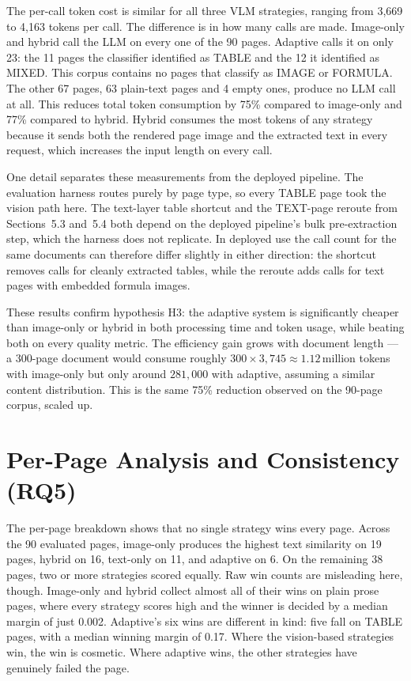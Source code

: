 The per-call token cost is similar for all three VLM strategies, ranging
from 3{,}669 to 4{,}163 tokens per call. The difference is in how many
calls are made. Image-only and hybrid call the LLM on every one of the
90 pages. Adaptive calls it on only 23: the 11 pages the classifier
identified as TABLE and the 12 it identified as MIXED. This corpus
contains no pages that classify as IMAGE or FORMULA. The other 67 pages,
63 plain-text pages and 4 empty ones, produce no LLM call at all.
This reduces total token consumption by 75\% compared to image-only and
77\% compared to hybrid. Hybrid consumes the most tokens of any strategy
because it sends both the rendered page image and the extracted text in
every request, which increases the input length on every call.

One detail separates these measurements from the deployed pipeline.
The evaluation harness routes purely by page type, so every TABLE page
took the vision path here. The text-layer table shortcut and the TEXT-page
reroute from Sections~5.3 and~5.4 both depend on the deployed pipeline's
bulk pre-extraction step, which the harness does not replicate. In deployed
use the call count for the same documents can therefore differ slightly in
either direction: the shortcut removes calls for cleanly extracted tables,
while the reroute adds calls for text pages with embedded formula images.

These results confirm hypothesis H3: the adaptive system is significantly
cheaper than image-only or hybrid in both processing time and token usage,
while beating both on every quality metric. The efficiency gain grows
with document length --- a 300-page document would consume roughly
$300 \times 3{,}745 \approx 1.12$\,million tokens with image-only but only
around $281{,}000$ with adaptive, assuming a similar content distribution.
This is the same 75\% reduction observed on the 90-page corpus, scaled up.

\section{Per-Page Analysis and Consistency (RQ5)}
\label{sec:rq5_consistency}

The per-page breakdown shows that no single strategy wins every page.
Across the 90 evaluated pages, image-only produces the highest text
similarity on 19 pages, hybrid on 16, text-only on 11, and adaptive on 6.
On the remaining 38 pages, two or more strategies scored equally.
Raw win counts are misleading here, though. Image-only and hybrid collect
almost all of their wins on plain prose pages, where every strategy scores
high and the winner is decided by a median margin of just 0.002. Adaptive's
six wins are different in kind: five fall on TABLE pages, with a median
winning margin of 0.17. Where the vision-based strategies win, the win is
cosmetic. Where adaptive wins, the other strategies have genuinely failed
the page.

